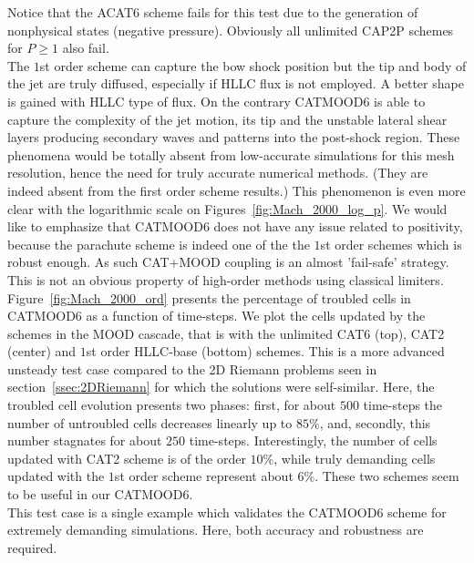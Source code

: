 Notice that the ACAT6 scheme fails for this test due to the generation of nonphysical states (negative pressure). Obviously all unlimited CAP2P schemes for $P\geq1$ also fail.\\
The $1$st order scheme can capture the bow shock position but the tip and body of the jet are truly diffused, especially if HLLC flux is not employed. A better shape is gained with HLLC type of flux.
On the contrary CATMOOD6 is able to capture the complexity of the jet motion, its tip and the unstable lateral shear layers producing secondary waves and patterns into the post-shock region. These phenomena would be totally absent from low-accurate simulations for this mesh resolution, hence the need for truly accurate numerical methods. (They are indeed absent from the first order scheme results.)
This phenomenon is even more clear with the logarithmic scale on Figures~\ref{fig:Mach_2000_log_p}.
We would like to emphasize that CATMOOD6 does not have any issue related to positivity, because the parachute scheme is indeed one of the  the $1$st order schemes which is robust enough. As such CAT+MOOD coupling is an almost 'fail-safe' strategy. This is not an obvious property of high-order methods using  classical \apriori limiters. \\
Figure~\ref{fig:Mach_2000_ord} presents the percentage of troubled cells in CATMOOD6 as a function of time-steps.
We plot the cells updated by the schemes in the MOOD cascade, that is with the unlimited CAT6 (top), CAT2 (center) and $1$st order HLLC-base (bottom) schemes.
This is a more advanced unsteady test case compared to the 2D Riemann problems seen in section~\ref{ssec:2DRiemann} for which the solutions were self-similar.
Here, the troubled cell evolution presents two phases: first, for about $500$ time-steps the number of untroubled cells decreases linearly up to $85\%$, and, secondly, this number stagnates for about $250$ time-steps.
Interestingly, the number of cells updated with CAT2 scheme is of the order $10\%$, while truly demanding cells updated with the $1$st order scheme represent about $6\%$. 
These two schemes seem to be useful in our CATMOOD6. \\
% 
This test case is a single example which validates the CATMOOD6 scheme for extremely demanding simulations. Here, both accuracy and robustness are required. 





